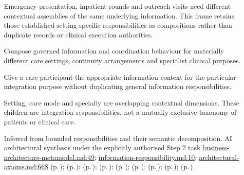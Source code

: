 Emergency presentation, inpatient rounds and outreach visits need different contextual assemblies of the same underlying information. This frame retains those established setting-specific responsibilities as compositions rather than duplicate records or clinical execution authorities.



Compose governed information and coordination behaviour for materially different care settings, continuity arrangements and specialist clinical purposes.



Give a care participant the appropriate information context for the particular integration purpose without duplicating general information responsibilities.



Setting, care mode and specialty are overlapping contextual dimensions. These children are integration responsibilities, not a mutually exclusive taxonomy of patients or clinical care.


Inferred from bounded responsibilities and their semantic decomposition. AI architectural synthesis under the explicitly authorised Step 2 task \hyperref[evidence:4bac85accd34ce0b]{business-architecture-metamodel.md:49}; \hyperref[evidence:be61392fefb4bb10]{information-responsibility.md:10}; \hyperref[evidence:27549d51551beae6]{architectural-axioms.md:668}
 (p.\,\pageref{cap:bec-reviewed-clinical-service-dependency-management});  (p.\,\pageref{cap:bec-patient-clinical-record});  (p.\,\pageref{cap:bec-episode-encounter-administration});  (p.\,\pageref{cap:bec-emergency-department-operations});  (p.\,\pageref{cap:bec-ward-operations});  (p.\,\pageref{cap:bec-diagnostic-administration});  (p.\,\pageref{cap:bec-medication-administration});  (p.\,\pageref{cap:bec-client-centred-administration});  (p.\,\pageref{cap:bec-care-plan-administration})
